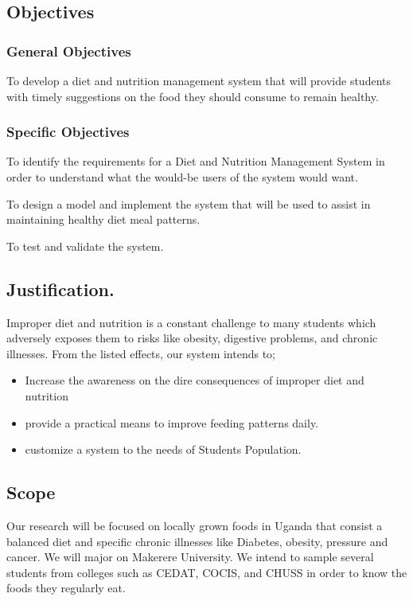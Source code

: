 \documentclass{article}
\begin{document}
\subsection{Objectives}
\subsubsection{General Objectives}

To develop a diet and nutrition management system that will provide students with timely suggestions on the food they should consume to remain healthy. 

\subsubsection{Specific Objectives}

To identify the requirements for a Diet and Nutrition Management System in order to understand what the would-be users of the system would want.

To design a model and implement the system that will be used to assist in maintaining healthy diet meal patterns.

To test and validate the system.  

\subsection{Justification.}
Improper diet and nutrition is a constant challenge to many students which adversely exposes them to risks like obesity, digestive problems, and chronic illnesses. From the listed effects, our system intends to; 
\begin{itemize}
  \item Increase the awareness on the dire consequences of improper diet and nutrition
  \item provide a practical means to improve feeding patterns daily. 
  \item customize a system to the needs of Students Population. 

\end{itemize}

\subsection{Scope}
Our research will be focused on locally grown foods in Uganda that consist a balanced diet and specific chronic illnesses like Diabetes, obesity, pressure and cancer. We will major on Makerere University. We intend to sample several students from colleges such as CEDAT, COCIS, and CHUSS in order to know the foods they regularly eat.
\end{document}
